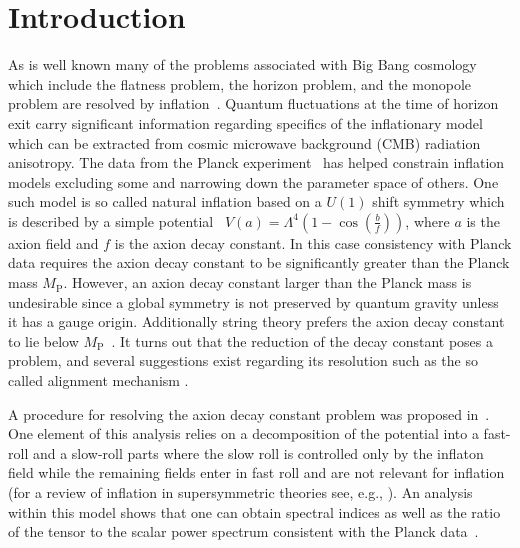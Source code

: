 \documentclass[12pt]{article}
\begin{document}
\section{Introduction \label{sec1}}
  As is well known many of the problems associated with Big Bang cosmology which include
  the flatness problem, the horizon problem, and the monopole problem are resolved by inflation~\cite{Guth:1980zm,Starobinsky:1980te,Linde:1981mu,Albrecht:1982wi,Sato,Linde:1983gd}.
  Quantum fluctuations at the time of horizon exit carry significant information regarding specifics
  of the inflationary model~\cite{Mukhanov+,Cheung:2007st}
  which can be extracted from cosmic microwave background (CMB) radiation anisotropy.
  The data from the Planck experiment~\cite{Adam:2015rua,Ade:2015lrj,Array:2015xqh} has helped
  constrain inflation models excluding some and narrowing down the parameter space of others.
  One such model is so called natural inflation based on a $U(1)$ shift symmetry
  which is described by a simple potential~\cite{Freese:1990rb,Adams:1992bn}
  $V(a) = \Lambda^4 \left(1- \cos(\frac{b}{f})\right)$,
  where $a$ is the axion field and $f$ is the axion decay constant.
  In this case consistency with Planck data requires the axion decay constant to be significantly greater than the Planck mass $M_\text{P}$.
  However, an axion decay constant larger than the Planck mass is undesirable since a global symmetry is not preserved by quantum gravity
  unless it has a gauge origin. Additionally string theory prefers the axion decay constant to lie below $M_\text{P}$~\cite{Banks:2003sx,Svrcek:2006yi}.
  It turns out that the reduction of the decay constant poses a problem, and several suggestions exist regarding its resolution such as the
  so called alignment mechanism \cite{Kim:2004rp,Long:2014dta}.

  A procedure for resolving the axion decay constant problem was proposed in~\cite{Nath:2017ihp}.
  One element of this analysis relies on a
  decomposition of the potential into a fast-roll and a slow-roll parts where the slow roll is controlled only by the inflaton field while the remaining fields enter in fast roll and are not relevant for
  inflation~\cite{Nath:2017ihp} (for a review of inflation in supersymmetric theories see, e.g., \cite{Nath:2016qzm}).
  An analysis within this model shows that one can obtain
  spectral indices as well as the ratio of the tensor to the scalar power spectrum consistent with the Planck data~\cite{Adam:2015rua,Ade:2015lrj,Array:2015xqh}.
\end{document}
